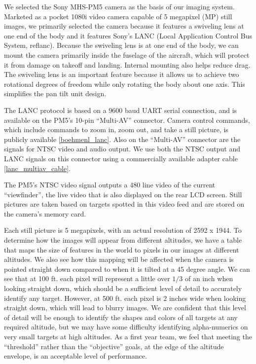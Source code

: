 \documentclass[10pt]{report}
\begin{document}
We selected the Sony MHS-PM5 camera as the basis of our imaging system. Marketed as a pocket 1080i video camera capable of 5 megapixel (MP) still images, we primarily selected the camera because it features a swiveling lens at one end of the body and it features Sony's LANC (Local Application Control Bus System, ref{lanc}). Because the swiveling lens is at one end of the body, we can mount the camera primarily inside the fuselage of the aircraft, which will protect it from damage on takeoff and landing. Internal mounting also helps reduce drag. The swiveling lens is an important feature because it allows us to achieve two rotational degrees of freedom while only rotating the body about one axis. This simplifies the pan tilt unit design.

The LANC protocol is based on a 9600 baud UART serial connection, and is available on the PM5's 10-pin ``Multi-AV'' connector. Camera control commands, which include commands to zoom in, zoom out, and take a still picture, is publicly available \ref{boehmenl_lanc}. Also on the ``Multi-AV'' connector are the signals for NTSC video and audio output. We use both the NTSC output and LANC signals on this connector using a commercially available adapter cable \ref{lanc_multiav_cable}.


The PM5's NTSC video signal outputs a 480 line video of the current ``viewfinder'', the live video that is also displayed on the rear LCD screen. 
Still pictures are taken based on targets spotted in this video feed and are stored on the camera's memory card.

Each still picture is 5 megapixels, with an actual resolution of 2592 x 1944.  To determine how the images will appear from different altitudes, we have a table that maps the size of features in the world to pixels in our images at different altitudes.  We also see how this mapping will be affected when the camera is pointed straight down compared to when it is tilted at a 45 degree angle.  We can see that at 100 ft. each pixel will represent a little over $1/3$ of an inch when looking straight down, which should be a sufficient level of detail to accurately identify any target.  However, at 500 ft. each pixel is 2 inches wide when looking straight down, which will lead to blurry images.  We are confident that this level of detail will be enough to identify the shapes and colors of all targets at any required altitude, but we may have some difficulty identifying alpha-numerics on very small targets at high altitudes.  As a first year team, we feel that meeting the ``threshold'' rather than the ``objective'' goals, at the edge of the altitude envelope, is an acceptable level of performance.
\end{document}
